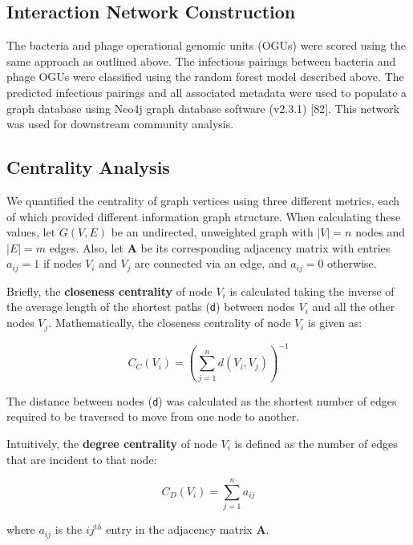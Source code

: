 \documentclass[12pt,]{article}
\begin{document}
\subsection{Interaction Network
Construction}\label{interaction-network-construction}

The bacteria and phage operational genomic units (OGUs) were scored
using the same approach as outlined above. The infectious pairings
between bacteria and phage OGUs were classified using the random forest
model described above. The predicted infectious pairings and all
associated metadata were used to populate a graph database using Neo4j
graph database software (v2.3.1) {[}82{]}. This network was used for
downstream community analysis.

\subsection{Centrality Analysis}\label{centrality-analysis}

We quantified the centrality of graph vertices using three different
metrics, each of which provided different information graph structure.
When calculating these values, let \(G(V,E)\) be an undirected,
unweighted graph with \(|V|=n\) nodes and \(|E|=m\) edges. Also, let
\(\mathbf{A}\) be its corresponding adjacency matrix with entries
\(a_{ij} = 1\) if nodes \(V_i\) and \(V_j\) are connected via an edge,
and \(a_{ij} = 0\) otherwise.

Briefly, the \textbf{closeness centrality} of node \(V_i\) is calculated
taking the inverse of the average length of the shortest paths
(\texttt{d}) between nodes \(V_i\) and all the other nodes \(V_j\).
Mathematically, the closeness centrality of node \(V_i\) is given as:

\[ { C }_{ C }\left( { V }_{ i } \right) ={ \left( \sum _{ j=1 }^{ n }{ d\left( { V }_{ i },{ V }_{ j } \right)  }  \right)  }^{ -1 } \]

The distance between nodes (\texttt{d}) was calculated as the shortest
number of edges required to be traversed to move from one node to
another.

Intuitively, the \textbf{degree centrality} of node \(V_i\) is defined
as the number of edges that are incident to that node:

\[ { C }_{ D }\left( { V }_{ i } \right) =\sum _{ j=1 }^{ n }{ { a }_{ ij } } \]

where \(a_{ij}\) is the \(ij^{th}\) entry in the adjacency matrix
\(\mathbf{A}\).
\end{document}
